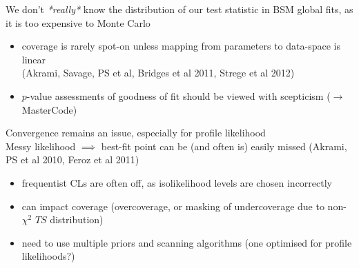 \documentclass[xcolor=dvipsnames]{beamer}
\newcommand{\cblue}[1]{{\color[rgb]{0.1, 0.0, 0.6} #1}}
\begin{document}
\cblue{We don't \textit{*really*} know the distribution of our test statistic in BSM global fits, as it is too expensive to Monte Carlo}
      \begin{itemize}\footnotesize
                 \item coverage is rarely spot-on unless mapping from parameters to data-space is linear \\
                 \footnotesize(Akrami, Savage, PS et al, Bridges et al 2011, Strege et al 2012)
                 \item $p$-value assessments of goodness of fit should be viewed with scepticism ($\rightarrow$MasterCode)
                 \end{itemize}
\cblue{Convergence remains an issue, especially for profile likelihood}\\
Messy likelihood $\implies$ best-fit point can be (and often is) easily missed (Akrami, PS et al 2010, Feroz et al 2011)
      \begin{itemize}\footnotesize
                 \item frequentist CLs are often off, as isolikelihood levels are chosen incorrectly
                 \item can impact coverage (overcoverage, or masking of undercoverage due to non-$\chi^2$ $TS$ distribution)
                 \item need to use multiple priors and scanning algorithms (one optimised for profile likelihoods?)  
                 \end{itemize}
\end{document}
